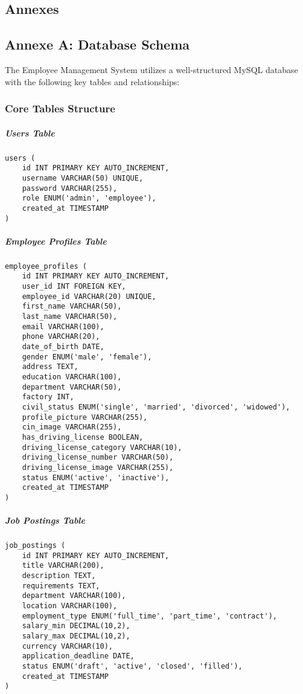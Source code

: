 \begin{center}
   \chapter{Annexes}
\label{chap:annexes}

\section{Annexe A: Database Schema}
\label{sec:database-schema}

The Employee Management System utilizes a well-structured MySQL database with the following key tables and relationships:

\subsection{Core Tables Structure}

\paragraph{Users Table}
\begin{verbatim}
users (
    id INT PRIMARY KEY AUTO_INCREMENT,
    username VARCHAR(50) UNIQUE,
    password VARCHAR(255),
    role ENUM('admin', 'employee'),
    created_at TIMESTAMP
)
\end{verbatim}

\paragraph{Employee Profiles Table}
\begin{verbatim}
employee_profiles (
    id INT PRIMARY KEY AUTO_INCREMENT,
    user_id INT FOREIGN KEY,
    employee_id VARCHAR(20) UNIQUE,
    first_name VARCHAR(50),
    last_name VARCHAR(50),
    email VARCHAR(100),
    phone VARCHAR(20),
    date_of_birth DATE,
    gender ENUM('male', 'female'),
    address TEXT,
    education VARCHAR(100),
    department VARCHAR(50),
    factory INT,
    civil_status ENUM('single', 'married', 'divorced', 'widowed'),
    profile_picture VARCHAR(255),
    cin_image VARCHAR(255),
    has_driving_license BOOLEAN,
    driving_license_category VARCHAR(10),
    driving_license_number VARCHAR(50),
    driving_license_image VARCHAR(255),
    status ENUM('active', 'inactive'),
    created_at TIMESTAMP
)
\end{verbatim}

\paragraph{Job Postings Table}
\begin{verbatim}
job_postings (
    id INT PRIMARY KEY AUTO_INCREMENT,
    title VARCHAR(200),
    description TEXT,
    requirements TEXT,
    department VARCHAR(100),
    location VARCHAR(100),
    employment_type ENUM('full_time', 'part_time', 'contract'),
    salary_min DECIMAL(10,2),
    salary_max DECIMAL(10,2),
    currency VARCHAR(10),
    application_deadline DATE,
    status ENUM('draft', 'active', 'closed', 'filled'),
    created_at TIMESTAMP
)
\end{verbatim}


\end{center}
